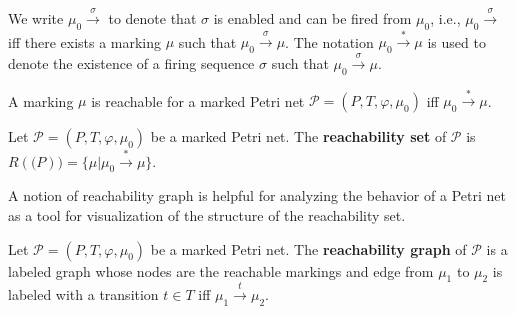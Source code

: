 We write $\mu_0\xrightarrow{\sigma}$ to denote that $\sigma$ is enabled and can be fired from $\mu_0$, i.e., $\mu_0\xrightarrow{\sigma}$ iff there exists a marking $\mu$ such that $\mu_0\xrightarrow{\sigma}\mu$.
The notation $\mu_0\xrightarrow{*}\mu$ is used to denote the existence of a firing sequence $\sigma$ such that $\mu_0\xrightarrow{\sigma}\mu$.

\begin{definition}
  A marking $\mu$ is reachable for a marked Petri net $\mathcal P = (P,T,\varphi,\mu_0)$ iff $\mu_0\xrightarrow{*}\mu$.
\end{definition}

\begin{definition}
  Let $\mathcal P = (P,T,\varphi,\mu_0)$ be a marked Petri net. The  {\bf reachability set} of $\mathcal P$ is $R(\mathcal(P)) = \{\mu|\mu_0\xrightarrow{*}\mu\}$.
\end{definition}

A notion of reachability graph is helpful for analyzing the behavior of a Petri net as a tool for visualization of the structure of the reachability set.

\begin{definition}
  Let $\mathcal P = (P,T,\varphi,\mu_0)$ be a marked Petri net. The  {\bf reachability graph} of $\mathcal P$ is a labeled graph whose nodes are the reachable markings and edge from $\mu_1$ to $\mu_2$ is labeled with a transition $t\in T$ iff $\mu_1\xrightarrow{t}\mu_2$.
\end{definition}

